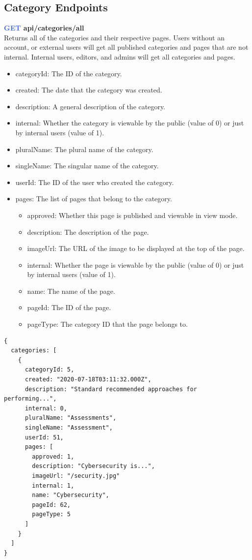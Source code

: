 \documentclass[onecolumn, draftclsnofoot,10pt, compsoc, usenames, dvipsnames]{IEEEtran}
\begin{document}
\subsection{Category Endpoints}


\noindent
\textbf{\textcolor{RoyalBlue}{GET} api/categories/all} \\
Returns all of the categories and their respective pages. Users without an account, or external users will get all published categories and pages that are not internal. Internal users, editors, and admins will get all categories and pages.
\begin{itemize}
    \item categoryId: The ID of the category.
    \item created: The date that the category was created.
    \item description: A general description of the category.
    \item internal: Whether the category is viewable by the public (value of 0) or just by internal users (value of 1).
    \item pluralName: The plural name of the category.
    \item singleName: The singular name of the category.
    \item userId: The ID of the user who created the category.
    \item pages: The list of pages that belong to the category.
    \begin{itemize}
        \item approved: Whether this page is published and viewable in view mode.
        \item description: The description of the page.
        \item imageUrl: The URL of the image to be displayed at the top of the page.
        \item internal: Whether the page is viewable by the public (value of 0) or just by internal users (value of 1).
        \item name: The name of the page.
        \item pageId: The ID of the page.
        \item pageType: The category ID that the page belongs to.
    \end{itemize}
\end{itemize}
\begin{lstlisting}[caption=Example Response]
{ 
  categories: [
    {
      categoryId: 5,
      created: "2020-07-18T03:11:32.000Z",
      description: "Standard recommended approaches for performing...",
      internal: 0,
      pluralName: "Assessments",
      singleName: "Assessment",
      userId: 51,
      pages: [
        approved: 1,
        description: "Cybersecurity is...",
        imageUrl: "/security.jpg"
        internal: 1,
        name: "Cybersecurity",
        pageId: 62,
        pageType: 5
      ]
    }
  ]
}
\end{lstlisting}
\\~\\
\end{document}
